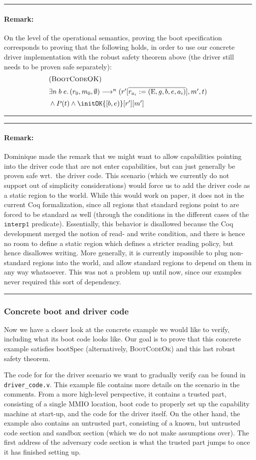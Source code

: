 \documentclass{article}
\newcommand{\X}[1]{\ensuremath{\mathrm{#1}}}
\newcommand{\I}[1]{\ensuremath{\mathtt{#1}}}
\newcommand{\T}[1]{\texttt{#1}}
\newenvironment{remark}
{ \bigskip\hrule\vspace{-1.3em}\nobreak
  \paragraph*{Remark:}}
{\vspace*{0.5em}\hrule\medskip}
\begin{document}
\begin{remark}
  On the level of the operational semantics, proving the boot specification
  corresponds to proving that the following holds, in order to use our concrete
  driver implementation with the robust safety theorem above (the driver still
  needs to be proven safe separately):
\[
  \begin{array}{l}
    (\textsc {BootCodeOK}) \\[0.5em]
%
    \exists n\; b\; e\ldotp (r_0, m_0, \emptyset) \longrightarrow^n (r'[\overline{r_{a_{i}}
    := (\X{E}, g, b, e, a_i)}], m', t) \\[0.5em]
    {} \land P(t) \land \initOK{[b,e)}[r'][m']
  \end{array}
\]
\end{remark}
\begin{remark}
 Dominique made the remark that we might want to allow capabilities pointing
 into the driver code that are not enter capabilities, but can just generally be
 proven safe wrt.\ the driver code. This scenario (which we currently do not
 support out of simplicity considerations) would force us to add the driver code
 as a static region to the world. While this would work on paper, it does not in the
 current Coq formalization, since all regions that standard regions point to are
 forced to be standard as well (through the conditions in the different cases of
 the $\I{interp1}$ predicate). Essentially, this behavior is disallowed because
 the Coq development merged the notion of read- and write condition, and there
 is hence no room to define a static region which defines a stricter reading
 policy, but hence disallowes writing. More generally, it is currently
 impossible to plug non-standard regions into the world, and allow standard
 regions to depend on them in any way whatsoever. This was not a problem up
 until now, since our examples never required this sort of dependency.
\end{remark}
\subsubsection{Concrete boot and driver code}
\label{subsec:driverimpl}
Now we have a closer look at the concrete example we would like to verify,
including what its boot code looks like. Our goal is to prove that this concrete
example satisfies \X{bootSpec} (alternatively, \textsc{BootCodeOk}) and this
last robust safety theorem.

The code for for the driver scenario we want to gradually verify can
be found in \T{driver\_code.v}. This example file contains more details on the
scenario in the comments. From a more high-level perspective, it contains a
trusted part, consisting of a single MMIO location, boot code to properly set up
the capability machine at start-up, and the code for the driver itself. On the
other hand, the example also contains an untrusted part, consisting of a known,
but untrusted code section and sandbox section (which we do not make assumptions
over).
The first address of the adversary code section is what the trusted part jumps
to once it has finished setting up.
\end{document}
